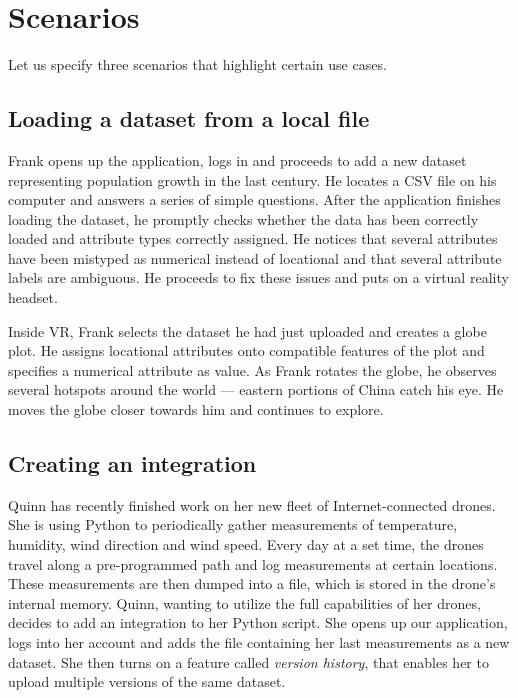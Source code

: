 \documentclass[thesis=M,english,hidelinks]{FITthesisXE}[2012/06/26]
\begin{document}
\section{Scenarios}

Let us specify three scenarios that highlight certain use cases.

\subsection{Loading a dataset from a local file}

Frank opens up the application, logs in and proceeds to add a new dataset representing population growth in the last century. He locates a CSV file on his computer and answers a series of simple questions. After the application finishes loading the dataset, he promptly checks whether the data has been correctly loaded and attribute types correctly assigned. He notices that several attributes have been mistyped as numerical instead of locational and that several attribute labels are ambiguous. He proceeds to fix these issues and puts on a virtual reality headset.

Inside VR, Frank selects the dataset he had just uploaded and creates a globe plot. He assigns locational attributes onto compatible features of the plot and specifies a numerical attribute as value. As Frank rotates the globe, he observes several hotspots around the world --- eastern portions of China catch his eye. He moves the globe closer towards him and continues to explore.

\subsection{Creating an integration}

Quinn has recently finished work on her new fleet of Internet-connected drones. She is using Python to periodically gather measurements of temperature, humidity, wind direction and wind speed. Every day at a set time, the drones travel along a pre-programmed path and log measurements at certain locations. These measurements are then dumped into a file, which is stored in the drone's internal memory. Quinn, wanting to utilize the full capabilities of her drones, decides to add an integration to her Python script. She opens up our application, logs into her account and adds the file containing her last measurements as a new dataset. She then turns on a feature called \emph{version history}, that enables her to upload multiple versions of the same dataset.
\end{document}
